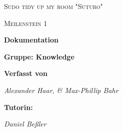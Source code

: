 \documentclass[12pt,a4paper]{report}
\begin{document}
\begin{titlepage}
	\centering
	{\scshape\LARGE Sudo tidy up my room "Suturo" \par}
	\vspace{1.5cm}
	{\scshape\Large Meilenstein 1\par}
	\vspace{1.5cm}
	{\huge\bfseries Dokumentation \par}
	\vspace{0.5cm}
	{\LARGE\bfseries Gruppe: Knowledge \par}	
	\vspace{2.5cm}
	{\normalsize\bfseries Verfasst von \par}
	{\small\itshape Alexander Haar, \& Max-Phillip Bahr\par}	
	\vspace{2.5cm}
	{\normalsize\bfseries Tutorin: \par}
	{\small\itshape Daniel Be{\ss}ler\par}


	\vfill
\end{titlepage}
\end{document}
